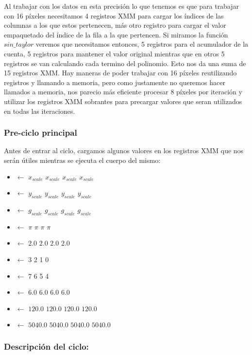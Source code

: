 Al trabajar con los datos en esta precisión lo que tenemos es que para trabajar con 16 píxeles necesitamos 4 registros XMM para cargar los índices de las columnas a los que estos pertenecen, más otro registro para cargar el valor empaquetado del índice de la fila a la que pertencen. Si miramos la función $sin\_taylor$ veremos que necesitamos entonces, 5 registros para el acumulador de la cuenta, 5 registros para mantener el valor original mientras que en otros 5 registros se van calculando cada termino del polinomio. Esto nos da una suma de 15 registros XMM. Hay maneras de poder trabajar con 16 píxeles reutilizando registros y llamando a memoria, pero como justamente no queremos hacer llamados a memoria, nos parecio más eficiente procesar 8 píxeles por iteración y utilizar los registros XMM sobrantes para precargar valores que seran utilizados en todas las iteraciones.


\subsubsection{Pre-ciclo principal}

Antes de entrar al ciclo, cargamos algunos valores en los registros XMM que nos serán útiles mientras se ejecuta el cuerpo del mismo:

\begin{itemize}
  \item {} $\leftarrow$ $x_{scale}$ $x_{scale}$ $x_{scale}$ $x_{scale}$
  \item {} $\leftarrow$ $y_{scale}$ $y_{scale}$ $y_{scale}$ $y_{scale}$
  \item {} $\leftarrow$ $g_{scale}$ $g_{scale}$ $g_{scale}$ $g_{scale}$
  \item {} $\leftarrow$ $\pi$ $\pi$ $\pi$ $\pi$
  \item {} $\leftarrow$ $2.0$ $2.0$ $2.0$ $2.0$
  \item {} $\leftarrow$ 3 2 1 0
  \item {} $\leftarrow$ 7 6 5 4
  \item {} $\leftarrow$ $6.0$ $6.0$ $6.0$ $6.0$
  \item {} $\leftarrow$ $120.0$ $120.0$ $120.0$ $120.0$
  \item {} $\leftarrow$ $5040.0$ $5040.0$ $5040.0$ $5040.0$
\end{itemize}


\subsubsection{Descripción del ciclo:}

